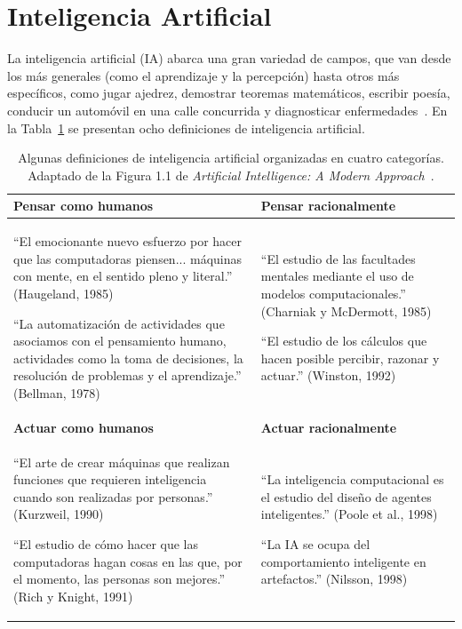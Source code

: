 \section{Inteligencia Artificial}
\label{sec:inteligencia_artificial}
La inteligencia artificial (IA) abarca una gran variedad de campos, que van desde los más generales (como el aprendizaje y la percepción) hasta otros más específicos, como jugar ajedrez, demostrar teoremas matemáticos, escribir poesía, conducir un automóvil en una calle concurrida y diagnosticar enfermedades~\cite{IABook}. En la Tabla~\ref{table:defIA} se presentan ocho definiciones de inteligencia artificial.

\begin{table}[!ht]
\centering
\begin{tabular}{|p{5cm}|p{5cm}|}
\hline
\textbf{Pensar como humanos} & \textbf{Pensar racionalmente} \\ \hline

``El emocionante nuevo esfuerzo por hacer que las computadoras piensen... máquinas con mente, en el sentido pleno y literal.'' (Haugeland, 1985)

``La automatización de actividades que asociamos con el pensamiento humano, actividades como la toma de decisiones, la resolución de problemas y el aprendizaje.'' (Bellman, 1978)

&
``El estudio de las facultades mentales mediante el uso de modelos computacionales.'' (Charniak y McDermott, 1985)

``El estudio de los cálculos que hacen posible percibir, razonar y actuar.'' (Winston, 1992)
\\ \hline

\textbf{Actuar como humanos} & \textbf{Actuar racionalmente} \\ \hline

``El arte de crear máquinas que realizan funciones que requieren inteligencia cuando son realizadas por personas.'' (Kurzweil, 1990)

``El estudio de cómo hacer que las computadoras hagan cosas en las que, por el momento, las personas son mejores.'' (Rich y Knight, 1991)

&
``La inteligencia computacional es el estudio del diseño de agentes inteligentes.'' (Poole et al., 1998)

``La IA se ocupa del comportamiento inteligente en artefactos.'' (Nilsson, 1998)
\\ \hline

\end{tabular}
\caption{Algunas definiciones de inteligencia artificial organizadas en cuatro categorías. Adaptado de la Figura 1.1 de \textit{Artificial Intelligence: A Modern Approach}~\protect\cite{IABook}.}
\label{table:defIA}
\end{table}

